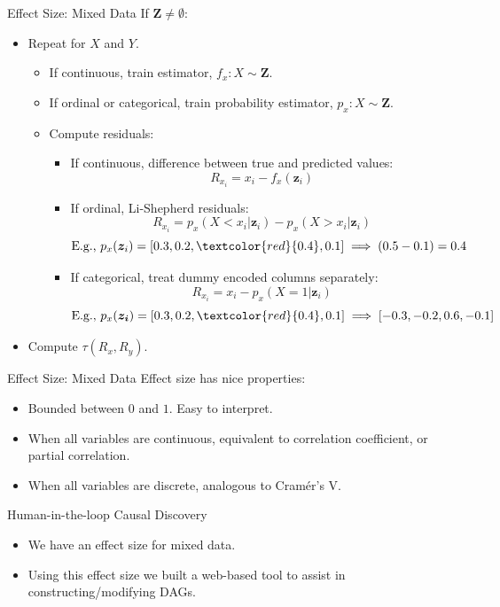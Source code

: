 \documentclass{beamer}
\begin{document}
\begin{frame}{Effect Size: Mixed Data}
	If $ \bm{Z} \ne \emptyset $:
	\begin{itemize}
		\item Repeat for $ X $ and $ Y $.
		\begin{itemize}
			\item If continuous, train estimator, $ f_x: X \sim \bm{Z} $.
			\item If ordinal or categorical, train probability estimator, $ p_x: X \sim \bm{Z} $.
			\item Compute residuals:
				\begin{itemize}
					\item If continuous, difference between true and predicted values:
						$$ R_{x_i} = x_i - f_x(\bm{z}_i) $$
					\item If ordinal, Li-Shepherd residuals:
						$$ R_{x_i} = p_x(X < x_i | \bm{z}_i) - p_x(X > x_i | \bm{z}_i) $$
						$$ \textnormal{E.g., } p_x(\bm{z}_i) = [0.3, 0.2, \textcolor{red}{0.4}, 0.1] \implies (0.5 - 0.1) = 0.4 $$
					\item If categorical, treat dummy encoded columns separately:
						$$ R_{x_i} = x_i - p_x(X=1 | \bm{z}_i) $$
						$$ \textnormal{E.g., } p_x(\bm{z_i}) = [0.3, 0.2, \textcolor{red}{0.4}, 0.1] \implies [-0.3, -0.2, 0.6, -0.1] $$
				\end{itemize}
		\end{itemize}
		\item Compute $ \tau(R_x, R_y) $.
	\end{itemize}
\end{frame}
\begin{frame}{Effect Size: Mixed Data}
	Effect size has nice properties:
	\begin{itemize}
		\item Bounded between $ 0 $ and $ 1 $. Easy to interpret.
		\item When all variables are continuous, equivalent to correlation coefficient, or partial correlation.
		\item When all variables are discrete, analogous to Cram\'er's V.
	\end{itemize}
\end{frame}
\begin{frame}{Human-in-the-loop Causal Discovery}
	\begin{itemize}
		\item We have an effect size for mixed data.
		\item Using this effect size we built a web-based tool to assist in constructing/modifying DAGs.
	\end{itemize}
\end{frame}
\end{document}
